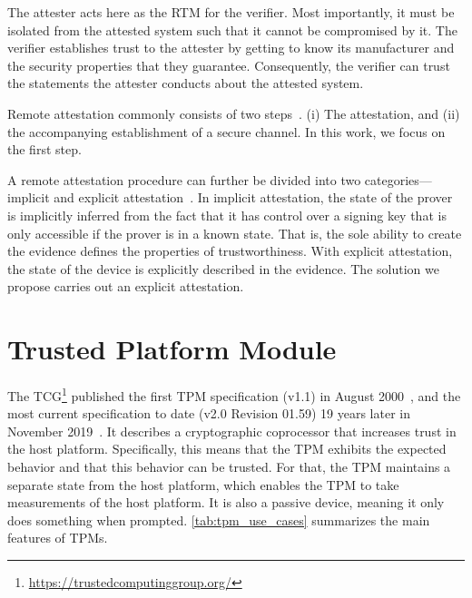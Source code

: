The attester acts here as the \ac{RTM} for the verifier.
Most importantly, it must be isolated from the attested system such that it cannot be compromised by it.
The verifier establishes trust to the attester by getting to know its manufacturer and the security properties that they guarantee.
Consequently, the verifier can trust the statements the attester conducts about the attested system.

Remote attestation commonly consists of two steps~\cite{McCune2008}.
(i) The attestation, and (ii) the accompanying establishment of a secure channel.
In this work, we focus on the first step.

A remote attestation procedure can further be divided into two categories---implicit and explicit attestation~\cite{dice-layering-arch}.
In implicit attestation, the state of the prover is implicitly inferred from the fact that it has control over a signing key that is only accessible if the prover is in a known state.
That is, the sole ability to create the evidence defines the properties of trustworthiness.
With explicit attestation, the state of the device is explicitly described in the evidence.
The solution we propose carries out an explicit attestation.

\section{Trusted Platform Module}\label{sec:tpm}

The \ac{TCG}\footnote{\url{https://trustedcomputinggroup.org/}} published the first TPM specification (v1.1) in August 2000~\cite{tpm11}, and the most current specification to date (v2.0 Revision 01.59) 19 years later in November 2019~\cite{tpm20}.
It describes a cryptographic coprocessor that increases trust in the host platform.
Specifically, this means that the TPM exhibits the expected behavior and that this behavior can be trusted.
For that, the TPM maintains a separate state from the host platform, which enables the TPM to take measurements of the host platform.
It is also a passive device, meaning it only does something when prompted.
\autoref{tab:tpm_use_cases} summarizes the main features of TPMs.



